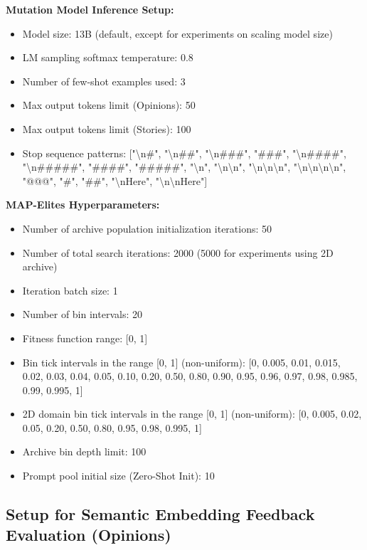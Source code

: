 \textbf{Mutation Model Inference Setup:}
\begin{itemize}
    \item Model size: 13B (default, except for experiments on scaling model size)
    \item LM sampling softmax temperature: 0.8
    \item Number of few-shot examples used: 3
    \item Max output tokens limit (Opinions): 50
    \item Max output tokens limit (Stories): 100
    \item Stop sequence patterns: ["\textbackslash{}n\#", "\textbackslash{}n\#\#", "\textbackslash{}n\#\#\#", "\#\#\#", "\textbackslash{}n\#\#\#\#", "\textbackslash{}n\#\#\#\#\#", "\#\#\#\#", "\#\#\#\#\#", "\textbackslash{}n", "\textbackslash{}n\textbackslash{}n", "\textbackslash{}n\textbackslash{}n\textbackslash{}n", "\textbackslash{}n\textbackslash{}n\textbackslash{}n\textbackslash{}n", "@@@", "\#", "\#\#", "\textbackslash{}nHere", "\textbackslash{}n\textbackslash{}nHere"]
\end{itemize}

\textbf{MAP-Elites Hyperparameters:}
\begin{itemize}
    \item Number of archive population initialization iterations: 50
    \item  Number of total search iterations: 2000 (5000 for experiments using 2D archive)
    \item Iteration batch size: 1
    \item Number of bin intervals: 20
    \item Fitness function range: [0, 1]
    \item Bin tick intervals in the range [0, 1] (non-uniform): [0, 0.005, 0.01, 0.015, 0.02, 0.03, 0.04, 0.05, 0.10, 0.20, 0.50, 0.80, 0.90, 0.95, 0.96, 0.97, 0.98, 0.985, 0.99, 0.995, 1]
    \item 2D domain bin tick intervals in the range [0, 1] (non-uniform): [0, 0.005, 0.02, 0.05, 0.20, 0.50, 0.80, 0.95, 0.98, 0.995, 1]
    \item Archive bin depth limit: 100
    \item Prompt pool initial size (Zero-Shot Init): 10
\end{itemize}

\subsection{Setup for Semantic Embedding Feedback Evaluation (Opinions)}\label{app:ef_setup_lmx}

